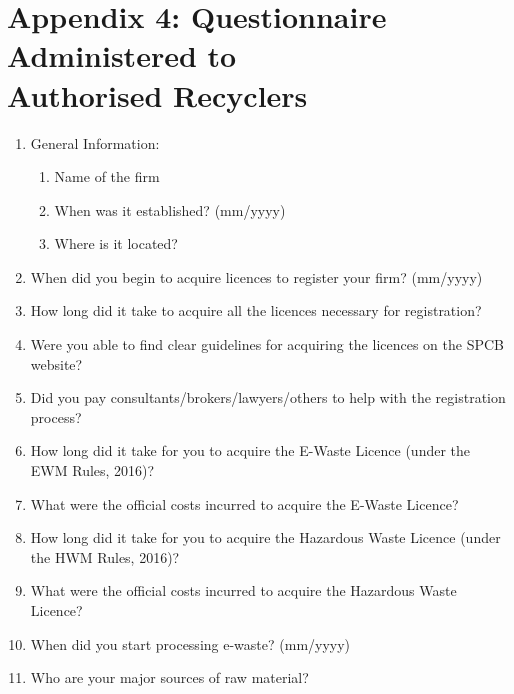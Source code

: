 \documentclass[a4paper, 12pt]{article}
\begin{document}
             \section*{Appendix 4: Questionnaire Administered to \\ Authorised Recyclers}
                    \begin{mdframed}[backgroundcolor=gray!20]
                    \begin{enumerate}
                       \item General Information:
                          \begin{enumerate}[noitemsep]
                          	 \item Name of the firm
                    	  \item When was it established? (mm/yyyy)
                    	   \item Where is it located?
                       \end{enumerate}
                       \item When did you begin to acquire licences to register your firm? (mm/yyyy)
                       \item How long did it take to acquire all the licences necessary for registration?
                       \item Were you able to find clear guidelines for acquiring the licences on the SPCB website? 
                       \item Did you pay consultants/brokers/lawyers/others to help with the registration process? 
                       \item How long did it take for you to acquire the E-Waste Licence (under the EWM Rules, 2016)?
                       \item What were the official costs incurred to acquire the E-Waste Licence?
                       \item How long did it take for you to acquire the Hazardous Waste Licence (under the HWM Rules, 2016)? 
                        \item What were the official costs incurred to acquire the Hazardous Waste Licence? 
                        \item When did you start processing e-waste? (mm/yyyy) 
                        \item Who are your major sources of raw material?

\end{enumerate}
\end{mdframed}
\end{document}
